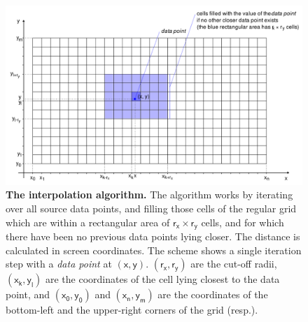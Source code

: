 
\begin{figure}[h]
\includegraphics[width=350pt]{images/interpolation.pdf}
\caption[The interpolation algorithm]{\textbf{The interpolation algorithm.} The algorithm works by iterating
over all source data points,
and filling those cells of the regular grid which are within a rectangular area
of $\mathsf{r_x \times r_y}$ cells,
and for which there have been no previous data points lying closer. The distance
is calculated in screen coordinates.
The scheme shows a single iteration step with a \textit{data point} at
$\mathsf{(x, y)}$.
$\mathsf{(r_x, r_y)}$ are the cut-off radii, $\mathsf{(x_k, y_l)}$ are the
coordinates of the cell lying closest to the data point, and
$\mathsf{(x_0, y_0)}$ and $\mathsf{(x_n, y_m)}$ are the coordinates of the
bottom-left and the upper-right corners of the grid (resp.).}
\label{fig:interpolation-algorithm}
\end{figure}

